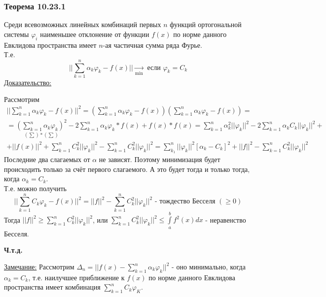 \documentclass[12pt]{article}
\let\oldint\int
\let\oldsum\sum
\renewcommand{\int}{\oldint\limits}
\renewcommand{\sum}{\oldsum\limits}
\begin{document}
    \subsubsection*{Теорема 10.23.1}\label{th:10.23.1}
    Среди всевозможных линейных комбинаций первых $n$ функций ортогональной системы $\varphi_i$ наименьшее отклонение от функции $f(x)$ по норме данного Евклидова пространства имеет $n$-ая частичная сумма ряда Фурье.\\
    Т.е. \[ \Big|\Big|\sum_{k=1}^{n}\alpha_k \varphi_k - f(x)\Big|\Big| \underset{\text{min}}{\to} \text{ если } \varphi_k = C_k \]
    \underline{Доказательство:}
    \begin{adjustwidth}{1.5em}{1.5em}
      Рассмотрим
      \begin{gather*}
          \Big|\Big|\sum_{k=1}^{n} \alpha_k \varphi_k - f(x)\Big|\Big|^2 = (\sum_{k=1}^{n}\alpha_k \varphi_k - f(x))(\sum_{k=1}^{n}\alpha_k \varphi_k - f(x)) =\\
          = \underset{(\sum) * (\sum)}{(\sum_{k=1}^{n} \alpha_k \varphi_k)^2} - 2 \sum_{k=1}^{n}\alpha_k \varphi_k * f(x) + f(x) * f(x) = \sum_{k=1}^{n}\alpha^2_k ||\varphi_k||^2 - 2 \sum_{k=1}^{n} \alpha_k C_k ||\varphi_k||^2 +\\
          + ||f(x)||^2 + \sum_{k=1}^{n}C^2_k ||\varphi_k||^2 - \sum_{k=1}^{n}C^2_k ||\varphi_k||^2 = \sum_{k_1}^{n} ||\varphi_k||^2 [ \alpha_k - C_k ]^2 + ||f||^2 - \sum_{k=1}^{n}C^2_k ||\varphi_k||^2
      \end{gather*}
      Последние два слагаемых от $\alpha$ не зависят. Поэтому минимизация будет происходить только за счёт первого слагаемого. А это будет тогда и только тогда, когда $\alpha_k = C_k$.\\
      Т.е. можно получить
      \[ \Big|\Big| \sum_{k=1}^{n} C_k \varphi_k - f(x)\Big|\Big|^2 = ||f||^2 - \sum_{k=1}^{n}C^2_k ||\varphi_k||^2 \text{ - тождество Бесселя } (\geq 0) \]
      Тогда $||f||^2 \geq \sum_{k=1}^{n}C^2_k ||\varphi_k||^2$, или $\sum_{k=1}^{n} C^2_k ||\varphi_k||^2 \leq \int_{a}^{b} f^2(x)dx$ - неравенство Бесселя.
      \begin{center}
          \textbf{Ч.т.д.}
      \end{center}
    \end{adjustwidth}
    \underline{Замечание:} Рассмотрим $\Delta_n = ||f(x) - \sum_{k=1}^{n}\alpha_k \varphi_k ||^2$ - оно минимально, когда $\alpha_k = C_k$, т.е. наилучшее приближение к $f(x)$ по норме данного Евклидова пространства имеет комбинация $\sum_{k=1}^{n} C_k \varphi_K$.
  
\end{document}

